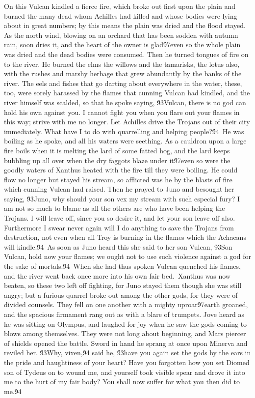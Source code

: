 {On this Vulcan kindled a fierce fire, which broke out first upon the plain and burned the many dead whom Achilles had killed and whose bodies were lying about in great numbers; by this means the plain was dried and the flood stayed. As the north wind, blowing on an orchard that has been sodden with autumn rain, soon dries it, and the heart of the owner is glad\'97even so the whole plain was dried and the dead bodies were consumed. Then he turned tongues of fire on to the river. He burned the elms the willows and the tamarisks, the lotus also, with the rushes and marshy herbage that grew abundantly by the banks of the river. The eels and fishes that go darting about everywhere in the water, these, too, were sorely harassed by the flames that cunning Vulcan had kindled, and the river himself was scalded, so that he spoke saying, \'93Vulcan, there is no god can hold his own against you. I cannot fight you when you flare out your flames in this way; strive with me no longer. Let Achilles drive the Trojans out of their city immediately. What have I to do with quarrelling and helping people?\'94\
He was boiling as he spoke, and all his waters were seething. As a cauldron upon a large fire boils when it is melting the lard of some fatted hog, and the lard keeps bubbling up all over when the dry faggots blaze under it\'97even so were the goodly waters of Xanthus heated with the fire till they were boiling. He could flow no longer but stayed his stream, so afflicted was he by the blasts of fire which cunning Vulcan had raised. Then he prayed to Juno and besought her saying, \'93Juno, why should your son vex my stream with such especial fury? I am not so much to blame as all the others are who have been helping the Trojans. I will leave off, since you so desire it, and let your son leave off also. Furthermore I swear never again will I do anything to save the Trojans from destruction, not even when all Troy is burning in the flames which the Achaeans will kindle.\'94\
As soon as Juno heard this she said to her son Vulcan, \'93Son Vulcan, hold now your flames; we ought not to use such violence against a god for the sake of mortals.\'94\
When she had thus spoken Vulcan quenched his flames, and the river went back once more into his own fair bed.\
Xanthus was now beaten, so these two left off fighting, for Juno stayed them though she was still angry; but a furious quarrel broke out among the other gods, for they were of divided counsels. They fell on one another with a mighty uproar\'97earth groaned, and the spacious firmament rang out as with a blare of trumpets. Jove heard as he was sitting on Olympus, and laughed for joy when he saw the gods coming to blows among themselves. They were not long about beginning, and Mars piercer of shields opened the battle. Sword in hand he sprang at once upon Minerva and reviled her. \'93Why, vixen,\'94 said he, \'93have you again set the gods by the ears in the pride and haughtiness of your heart? Have you forgotten how you set Diomed son of Tydeus on to wound me, and yourself took visible spear and drove it into me to the hurt of my fair body? You shall now suffer for what you then did to me.\'94\
}
